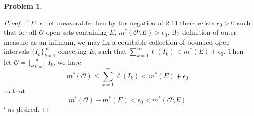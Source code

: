 \documentclass{article}
\newtheorem{prb}{Problem}
\begin{document}
\begin{prb}  \end{prb} 
\begin{proof} 
	if $E$ is not measurable then by the negation of 2.11 there exists $\epsilon_0 > 0$ such that for all $\mathcal{O}$ open sets 
	containing $E$, $m^*(\mathcal{O} \setminus E) > \epsilon_0$. By definition of outer measure as an infimum, we may fix a countable 
	collection of bounded open intervals $\{I_k\}_{k=1}^\infty$ convering $E$, such that $\sum_{k = 1}^\infty \ell(I_k) < m^*(E) + \epsilon_0$. 
	Then let $\mathcal{O} = \bigcup_{k=1}^\infty I_k$, we have 
	\[ m^*(\mathcal{O}) \leq \sum_{k=1}^\infty \ell(I_k) < m^*(E) + \epsilon_0 \] 
	so that 
	\[ m^*(\mathcal{O})- m^*(E) < \epsilon_0 < m^*(\mathcal{O} \setminus E)\]`
	as desired. 
\end{proof} 
\end{document}

